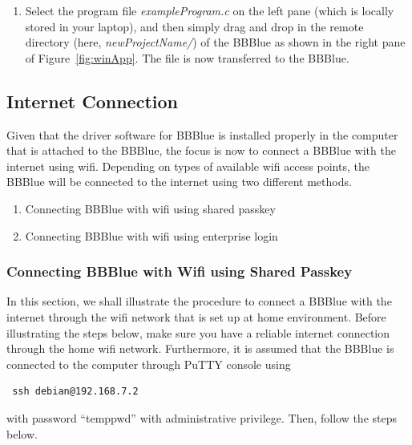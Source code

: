 \begin{enumerate}
    \item Select the program file \emph{exampleProgram.c} on the left pane (which is locally stored in your laptop), and then simply drag and drop in the remote directory (here, \emph{newProjectName/}) of the BBBlue as shown in the right pane of Figure~\ref{fig:winApp}. The file is now transferred to the BBBlue.%

    
\end{enumerate}

\subsection{Internet Connection}
Given that the driver software for BBBlue is installed properly in the computer
that is attached to the BBBlue, the focus is now to connect a BBBlue with the
internet using wifi. Depending on types of available wifi access points, the
BBBlue will be connected to the internet using two different methods. %
%
\begin{enumerate}
\item Connecting BBBlue with wifi using shared passkey
  
\item Connecting BBBlue with wifi using enterprise login  
\end{enumerate}

\subsubsection{Connecting BBBlue with Wifi using Shared Passkey}

In this section, we shall illustrate the procedure to connect a BBBlue with the
internet through the wifi network that is set up at home environment. Before
illustrating the steps below, make sure you have a reliable internet connection
through the home wifi network. Furthermore, it is assumed that the BBBlue is
connected to the computer through PuTTY console using 

\begin{verbatim}
 ssh debian@192.168.7.2
\end{verbatim}

with password ``temppwd'' with administrative privilege. Then, follow the steps
below.  

